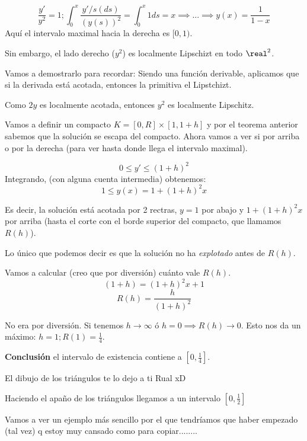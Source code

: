 \[\frac{y'}{y^2} = 1 ; \int_0^x \frac{y'/s(ds)}{(y(s))^2} = \int_0^x 1ds = x \implies ... \implies y(x) = \frac{1}{1-x}\]
Aquí el intervalo maximal hacia la derecha es $[0,1)$.

Sin embargo, el lado derecho ($y^2$) es localmente Lipschizt en todo $\real^2$.

Vamos a demostrarlo para recordar: Siendo una función derivable, aplicamos que si la derivada está acotada, entonces la primitiva el Lipstchizt. 

Como $2y$ es localmente acotada, entonces $y^2$ es localmente Lipschitz.

Vamos a definir un compacto $K = [0,R]×[1,1+h]$ y por el teorema anterior sabemos que la solución se escapa del compacto. Ahora vamos a ver si por arriba o por la derecha (para ver hasta donde llega el intervalo maximal).

\[0\leq y' \leq (1+h)^2\]
Integrando, (con alguna cuenta intermedia) obtenemos:
\[1\leq y (x) = 1 + (1+h)^2 x\]

Es decir, la solución está acotada por 2 rectras, $y=1$ por abajo y $1 + (1+h)^2 x$ por arriba (hasta el corte con el borde superior del compacto, que llamamos $R(h)$).

Lo único que podemos decir es que la solución no ha \textit{explotado} antes de $R(h)$.

Vamos a calcular (creo que por diversión) cuánto vale $R(h)$.
\[(1+h) = (1+h)^2x+1\]
\[R(h) = \frac{h}{(1+h)^2}\]


No era por diversión. Si tenemos $h\to \infty$ ó $h=0 \implies R(h) \to 0$. Esto nos da un máximo: $h=1; R(1)=\frac{1}{4}$.

\textbf{Conclusión} el intervalo de existencia contiene a $\left[0,\frac{1}{4}\right]$.

El dibujo de los triángulos te lo dejo a ti Rual xD

Haciendo el apaño de los triángulos llegamos a un intervalo $\left[0,\frac{1}{2}\right]$

Vamos a ver un ejemplo más sencillo por el que tendríamos que haber empezado (tal vez) q estoy muy cansado como para copiar........


